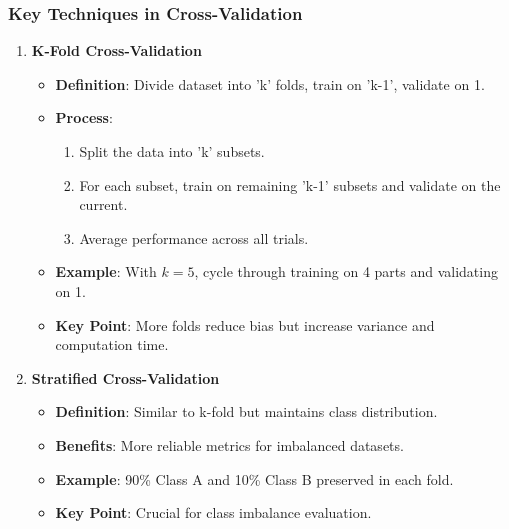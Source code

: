 \documentclass[aspectratio=169]{beamer}
\begin{document}
\begin{frame}[fragile]
    \frametitle{Key Techniques in Cross-Validation}
    
    \begin{enumerate}
        \item \textbf{K-Fold Cross-Validation}
            \begin{itemize}
                \item \textbf{Definition}: Divide dataset into 'k' folds, train on 'k-1', validate on 1.
                \item \textbf{Process}:
                    \begin{enumerate}
                        \item Split the data into 'k' subsets.
                        \item For each subset, train on remaining 'k-1' subsets and validate on the current.
                        \item Average performance across all trials.
                    \end{enumerate}
                \item \textbf{Example}: With $k=5$, cycle through training on 4 parts and validating on 1.
                \item \textbf{Key Point}: More folds reduce bias but increase variance and computation time.
            \end{itemize}
        
        \item \textbf{Stratified Cross-Validation}
            \begin{itemize}
                \item \textbf{Definition}: Similar to k-fold but maintains class distribution.
                \item \textbf{Benefits}: More reliable metrics for imbalanced datasets.
                \item \textbf{Example}: 90\% Class A and 10\% Class B preserved in each fold.
                \item \textbf{Key Point}: Crucial for class imbalance evaluation.
            \end{itemize}
    \end{enumerate}
\end{frame}
\end{document}
